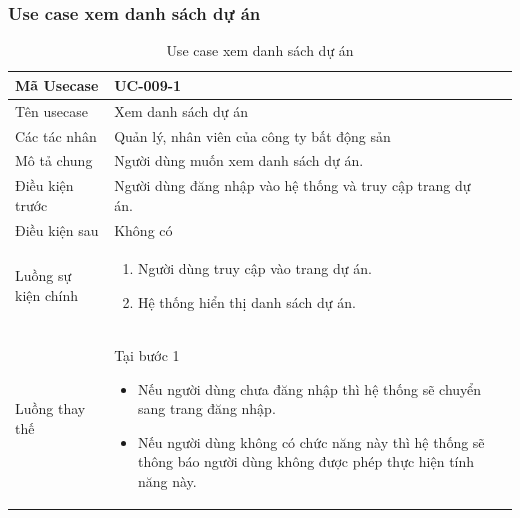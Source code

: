 \documentclass[12pt,a4paper]{article}
\begin{document}
    \subsubsection*{Use case xem danh sách dự án }
    \begin{table}[H]
        \centering
        \begin{tabular}{|p{3.5cm}|p{11.5cm}|c|}
            \hline
            Mã Usecase      & UC-009-1                                                   \\
            \hline
            Tên usecase     & Xem danh sách dự án                                        \\
            \hline
            Các tác nhân    & Quản lý, nhân viên của công ty bất động sản                \\
            \hline
            Mô tả chung     & Người dùng muốn xem danh sách dự án.                       \\
            \hline

            Điều kiện trước & Người dùng đăng nhập vào hệ thống và truy cập trang dự án. \\
            \hline

            Điều kiện sau   & Không có                                                   \\
            \hline

            Luồng sự kiện chính & \vspace{-.8cm}\begin{enumerate}
                                                    \item Người dùng truy cập vào trang dự án.
                                                    \item Hệ thống hiển thị danh sách dự án.
            \end{enumerate}
            \\
            \hline
            Luồng thay thế & Tại bước 1\newline
            \vspace{-.8cm}\begin{itemize}
                              \item Nếu người dùng chưa đăng nhập thì hệ thống sẽ chuyển sang trang đăng nhập.
                              \item  Nếu người dùng không có chức năng này thì hệ thống sẽ thông báo người dùng không được phép thực hiện tính năng này.
            \end{itemize}

            \\    \hline
        \end{tabular}
        \caption{Use case xem danh sách dự án }
    \end{table}
\end{document}
